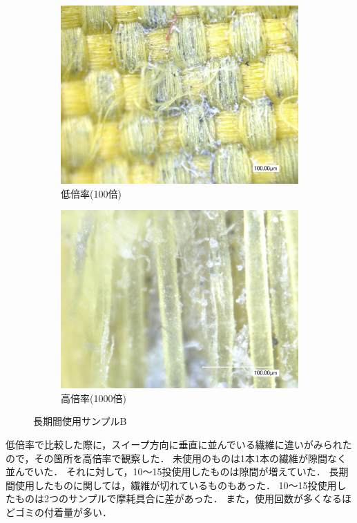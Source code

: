 \documentclass[main]{subfiles}
\begin{document}
\begin{figure}[H]
    \centering
    \begin{subfigure}[htbp]{0.45\linewidth}
        \centering
        \includegraphics[keepaspectratio, width=0.8\linewidth]{figures/縁/カーリングパッド長期低倍率B.jpg}
        \caption{低倍率(100倍)}
        \label{fig:label}
    \end{subfigure}
    \begin{subfigure}[htbp]{0.45\linewidth}
        \centering
        \includegraphics[keepaspectratio, width=0.8\linewidth]{figures/縁/カーリングパッド長期B.jpg}
        \caption{高倍率(1000倍)}
        \label{fig:label}
    \end{subfigure}
    \caption{長期間使用サンプルB}
    \label{fig:5}
\end{figure}

低倍率で比較した際に，スイープ方向に垂直に並んでいる繊維に違いがみられたので，その箇所を高倍率で観察した．
未使用のものは1本1本の繊維が隙間なく並んでいた．
それに対して，10～15投使用したものは隙間が増えていた．
長期間使用したものに関しては，繊維が切れているものもあった．
10～15投使用したものは2つのサンプルで摩耗具合に差があった．
また，使用回数が多くなるほどゴミの付着量が多い．
\end{document}
